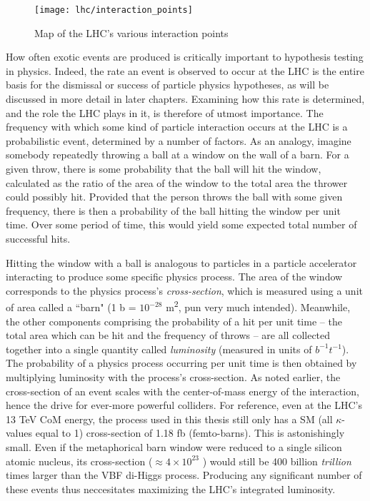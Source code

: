     \begin{figure}[h]
        \texttt{[image: lhc/interaction\_points]}
        \caption{Map of the LHC's various interaction points \cite{lhc_machine}}
        \label{fig:interaction_points}
    \end{figure}

    \FloatBarrier

    How often exotic events are produced is critically important to hypothesis testing in physics.
    Indeed, the rate an event is observed to occur at the LHC is the entire basis for the dismissal or success of particle physics hypotheses, as will be discussed in more detail in later chapters.
    Examining how this rate is determined, and the role the LHC plays in it, is therefore of utmost importance.
    The frequency with which some kind of particle interaction occurs at the LHC is a probabilistic event, determined by a number of factors.
    As an analogy, imagine somebody repeatedly throwing a ball at a window on the wall of a barn.
    For a given throw, there is some probability that the ball will hit the window, calculated as the ratio of the area of the window to the total area the thrower could possibly hit.
    Provided that the person throws the ball with some given frequency, there is then a probability of the ball hitting the window per unit time.
    Over some period of time, this would yield some expected total number of successful hits.

    

    Hitting the window with a ball is analogous to particles in a particle accelerator interacting to produce some specific physics process.
    The area of the window corresponds to the physics process's \textit{cross-section}, which is measured using a unit of area called a ``barn" (1 b = $10^{-28}$ m\textsuperscript{2}, pun very much intended).
    Meanwhile, the other components comprising the probability of a hit per unit time
        -- the total area which can be hit and the frequency of throws --
        are all collected together into a single quantity called \textit{luminosity} (measured in units of $b^{-1}t^{-1}$). 
    The probability of a physics process occurring per unit time is then obtained by multiplying luminosity with the process's cross-section.
    As noted earlier, the cross-section of an event scales with the center-of-mass energy of the interaction,
        hence the drive for ever-more powerful colliders.
    For reference, even at the LHC's 13 TeV CoM energy,
        the \vbfhhproc process used in this thesis still only has a SM (all $\kappa$-values equal to 1) cross-section of 1.18 fb (femto-barns).
    This is astonishingly small.
    Even if the metaphorical barn window were reduced to a single silicon atomic nucleus,
        its cross-section ($\approx 4 \times 10^{23}$ \ifb)
        would still be 400 billion \textit{trillion} times larger than the VBF di-Higgs process.
    Producing any significant number of these events thus neccesitates maximizing the LHC's integrated luminosity.

